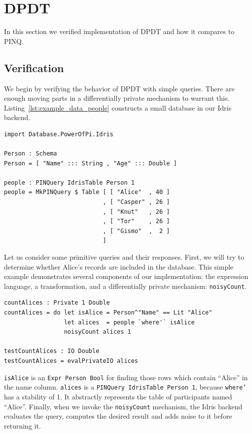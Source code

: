 \documentclass[12pt]{report}
\begin{document}
\section{DPDT}

In this section we verified implementation of DPDT and how it compares to PINQ.

\subsection{Verification}

We begin by verifying the behavior of DPDT with simple queries.
There are enough moving parts in a differentially private mechanism to warrant this.
Listing~\ref{lst:example_data_people} constructs a small database in our Idris backend.

\begin{lstlisting}[caption={Validation Data},label={lst:example_data_people}]
import Database.PowerOfPi.Idris

Person : Schema
Person = [ "Name" ::: String , "Age" ::: Double ]

people : PINQuery IdrisTable Person 1
people = MkPINQuery $ Table [ [ "Alice"  , 40 ]
                            , [ "Casper" , 26 ]
                            , [ "Knut"   , 26 ]
                            , [ "Tor"    , 26 ]
                            , [ "Gismo"  ,  2 ]
                            ]
\end{lstlisting}

Let us consider some primitive queries and their responses.
First, we will try to determine whether Alice's records are included in the database.
This simple example demonstrates several components of our implementation: the expression language, a transformation, and a differentially private mechanism: \texttt{noisyCount}.

\begin{lstlisting}[float,caption={Counting Alices},label={lst:counting_alices}]
countAlices : Private 1 Double
countAlices = do let isAlice = Person^"Name" == Lit "Alice"
                 let alices  = people `where'` isAlice
                 noisyCount alices 1

testCountAlices : IO Double
testCountAlices = evalPrivateIO alices
\end{lstlisting}

\texttt{isAlice} is an \texttt{Expr Person Bool} for finding those rows which contain ``Alice'' in the name column.
\texttt{alices} is a \texttt{PINQuery IdrisTable Person 1}, because \texttt{where'} has a stability of 1.
It abstractly represents the table of participants named ``Alice''.
Finally, when we invoke the \texttt{noisyCount} mechanism, the Idris backend evaluates the query, computes the desired result and adds noise to it before returning it.
\end{document}
